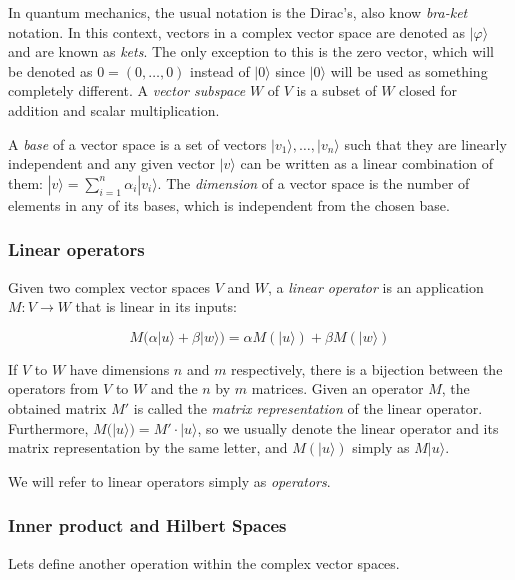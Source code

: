 In quantum mechanics, the usual notation is the Dirac's, also know \emph{bra-ket} notation. In this context, vectors in a complex vector space are denoted as $|\varphi\rangle$ and are known as \emph{kets}. The only exception to this is the zero vector, which will be denoted as $0 = (0, \dotsc, 0)$ instead of $|0\rangle$ since $|0\rangle$ will be used as something completely different. A \emph{vector subspace} $W$ of $V$ is a subset of $W$ closed for addition and scalar multiplication.

A \emph{base} of a vector space is a set of vectors $|v_1\rangle, \dotsc, |v_n\rangle$ such that they are linearly independent and any given vector $|v\rangle$ can be written as a linear combination of them: $|v\rangle = \sum_{i=1}^n \alpha_i|v_i\rangle$. The \emph{dimension} of a vector space is the number of elements in any of its bases, which is independent from the chosen base.


\subsubsection{Linear operators}


\begin{definition}
	Given two complex vector spaces $V$ and $W$, a \emph{linear operator} is an application $M: V \rightarrow W $ that is linear in its inputs:
	
	$$ M \Big( \alpha |u\rangle + \beta |w\rangle \Big) = \alpha M (|u\rangle) + \beta M (|w\rangle) $$
\end{definition}

If $V$ to $W$ have dimensions $n$ and $m$ respectively, there is a bijection between the operators from $V$ to $W$ and the $n$ by $m$ matrices. Given an operator $M$, the obtained matrix $M'$ is called the \emph{matrix representation} of the linear operator. Furthermore, $M(|u\rangle) = M' \cdot |u\rangle$, so we usually denote the linear operator and its matrix representation by the same letter, and $M(|u\rangle)$ simply as $M|u\rangle$.

We will refer to linear operators simply as \emph{operators}.


\subsubsection{Inner product and Hilbert Spaces}


Lets define another operation within the complex vector spaces.

